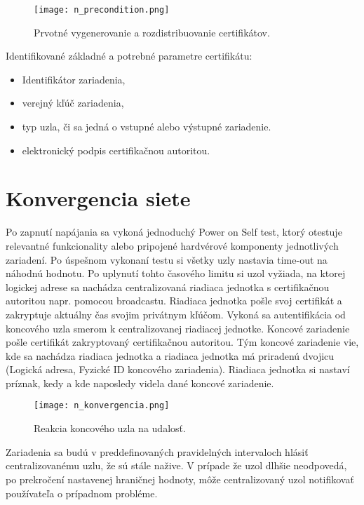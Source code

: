 \documentclass[12pt,a4paper,oneside,openright]{report}
\begin{document}

\begin{figure*}[h]
	\centering
	\texttt{[image: n\_precondition.png]}
	\caption{Prvotné vygenerovanie a rozdistribuovanie certifikátov.}
	\label{f:n_CA_distribution}
\end{figure*}


Identifikované základné a potrebné parametre  certifikátu:
\begin{itemize}
	\item Identifikátor zariadenia,
	\item verejný kľúč zariadenia,
	\item typ uzla, či sa jedná o vstupné alebo výstupné zariadenie.
	\item elektronický podpis certifikačnou autoritou.
\end{itemize}
\onehalfspacing

\section{Konvergencia siete}
Po zapnutí napájania sa vykoná jednoduchý Power on Self test, ktorý otestuje relevantné funkcionality alebo pripojené hardvérové komponenty jednotlivých zariadení. Po úspešnom vykonaní testu si všetky uzly nastavia time-out na náhodnú hodnotu. Po uplynutí tohto časového limitu si uzol vyžiada, na ktorej logickej adrese sa nachádza centralizovaná riadiaca jednotka s certifikačnou autoritou napr. pomocou broadcastu. Riadiaca jednotka pošle svoj certifikát a zakryptuje aktuálny čas svojim privátnym kľúčom. Vykoná sa autentifikácia od koncového uzla smerom k centralizovanej riadiacej jednotke. Koncové zariadenie pošle certifikát zakryptovaný certifikačnou autoritou. Tým koncové zariadenie vie, kde sa nachádza riadiaca jednotka a riadiaca jednotka má priradenú dvojicu (Logická adresa, Fyzické ID koncového zariadenia). Riadiaca jednotka si nastaví príznak, kedy a kde naposledy videla dané koncové zariadenie.

\begin{figure*}[h]
	\centering
	\texttt{[image: n\_konvergencia.png]}
	\caption{Reakcia koncového uzla na udalosť.}
	\label{f:n_konvergenica}
\end{figure*}

Zariadenia sa budú v preddefinovaných pravidelných intervaloch hlásiť centralizovanému uzlu, že sú stále nažive. V prípade že uzol dlhšie neodpovedá, po prekročení nastavenej hraničnej hodnoty, môže centralizovaný uzol notifikovať používateľa o prípadnom probléme.
\end{document}
